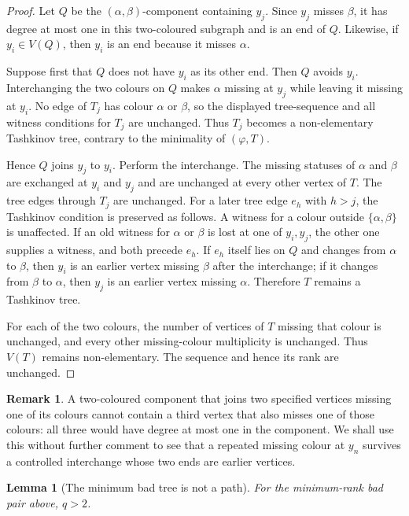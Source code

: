 \documentclass[11pt]{article}
\newtheorem{lemma}[theorem]{Lemma}
\theoremstyle{definition}
\newtheorem{remark}[theorem]{Remark}
\begin{document}
\begin{proof}
Let $Q$ be the $(\alpha,\beta)$-component containing $y_j$.  Since $y_j$
misses $\beta$, it has degree at most one in this two-coloured subgraph and is
an end of $Q$.  Likewise, if $y_i\in V(Q)$, then $y_i$ is an end because it
misses $\alpha$.

Suppose first that $Q$ does not have $y_i$ as its other end.  Then $Q$ avoids
$y_i$.  Interchanging the two colours on $Q$ makes $\alpha$ missing at $y_j$
while leaving it missing at $y_i$.  No edge of $T_j$ has colour $\alpha$ or
$\beta$, so the displayed tree-sequence and all witness conditions for $T_j$
are unchanged.  Thus $T_j$ becomes a non-elementary Tashkinov tree, contrary
to the minimality of $(\varphi,T)$.

Hence $Q$ joins $y_j$ to $y_i$.  Perform the interchange.  The missing statuses
of $\alpha$ and $\beta$ are exchanged at $y_i$ and $y_j$ and are unchanged at
every other vertex of $T$.  The tree edges through $T_j$ are unchanged.  For a
later tree edge $e_h$ with $h>j$, the Tashkinov condition is preserved as
follows.  A witness for a colour outside $\{\alpha,\beta\}$ is unaffected.  If
an old witness for $\alpha$ or $\beta$ is lost at one of $y_i,y_j$, the other
one supplies a witness, and both precede $e_h$.  If $e_h$ itself lies on $Q$
and changes from $\alpha$ to $\beta$, then $y_i$ is an earlier vertex missing
$\beta$ after the interchange; if it changes from $\beta$ to $\alpha$, then
$y_j$ is an earlier vertex missing $\alpha$.  Therefore $T$ remains a
Tashkinov tree.

For each of the two colours, the number of vertices of $T$ missing that colour
is unchanged, and every other missing-colour multiplicity is unchanged.
Thus $V(T)$ remains non-elementary.  The sequence and hence its rank are
unchanged.
\end{proof}

\begin{remark}\label{rem:third-endpoint}
A two-coloured component that joins two specified vertices missing one of its
colours cannot contain a third vertex that also misses one of those colours:
all three would have degree at most one in the component.  We shall use this
without further comment to see that a repeated missing colour at $y_n$ survives
a controlled interchange whose two ends are earlier vertices.
\end{remark}

\begin{lemma}[The minimum bad tree is not a path]\label{lem:not-path}
For the minimum-rank bad pair above, $q>2$.
\end{lemma}
\end{document}
